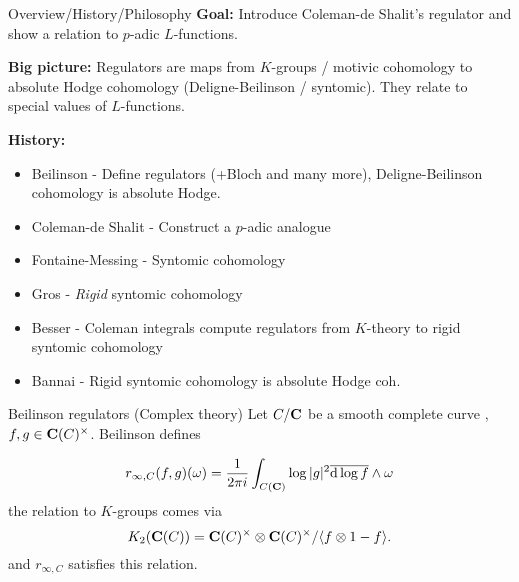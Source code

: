 
\begin{frame}{Overview/History/Philosophy}
\textbf{Goal:} Introduce Coleman-de Shalit's regulator and show a relation to \(p\)-adic \(L\)-functions.
\pause

\textbf{Big picture:} Regulators are maps from \(K\)-groups / motivic cohomology to absolute Hodge cohomology (Deligne-Beilinson / syntomic). They relate to special values of \(L\)-functions.
\pause

\textbf{History:}
\begin{itemize}
\item                    Beilinson - Define regulators (+Bloch and many more), Deligne-Beilinson cohomology is absolute Hodge.%
\item                    Coleman-de Shalit - Construct a \(p\)-adic analogue %
\item                    Fontaine-Messing - Syntomic cohomology%
\item                    Gros - \emph{Rigid} syntomic cohomology%
\item                    Besser - Coleman integrals compute regulators from \(K\)-theory to rigid syntomic cohomology%
\item                    Bannai - Rigid syntomic cohomology is absolute Hodge coh.
\end{itemize}
%
\end{frame}

\begin{frame}{Beilinson regulators (Complex theory)}
Let \(C/\mathbf C\) be a smooth complete curve%
, \(f,g\in\operatorname{\mathcal{\mathbf C}}(C)^\times\). %
Beilinson defines%

\begin{equation*}
r_{\infty,C}(f,g)(\omega) = \frac{1}{2 \pi i} \int_{C(\mathbf C)} \log |g|^2 \overline{\mathop{}\!\mathrm{d} \log f} \wedge \omega
\end{equation*}
the relation to \(K\)-groups comes via%
\begin{equation*}
K_2(\mathbf C(C)) = \mathbf C(C)^\times\otimes \mathbf C(C)^\times / \langle f \otimes 1-f \rangle\text{.}
\end{equation*}
and \(r_{\infty, C}\) satisfies this relation.

\end{frame}


